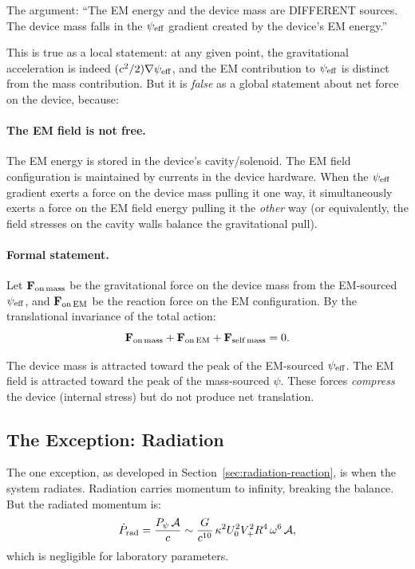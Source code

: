 \documentclass[11pt]{article}
\newcommand{\psieff}{\psi_{\rm eff}}
\begin{document}
The argument: ``The EM energy and the device mass are DIFFERENT sources.
The device mass falls in the $\psieff$ gradient created by the device's
EM energy.''

This is true as a local statement: at any given point, the gravitational
acceleration is indeed $(c^2/2)\nabla\psieff$, and the EM contribution to
$\psieff$ is distinct from the mass contribution. But it is \emph{false}
as a global statement about net force on the device, because:

\paragraph{The EM field is not free.}
The EM energy is stored in the device's cavity/solenoid. The EM field
configuration is maintained by currents in the device hardware. When the
$\psieff$ gradient exerts a force on the device mass pulling it one way,
it simultaneously exerts a force on the EM field energy pulling it the
\emph{other} way (or equivalently, the field stresses on the cavity walls
balance the gravitational pull).

\paragraph{Formal statement.}
Let $\mathbf{F}_{\rm on\,mass}$ be the gravitational force on the device
mass from the EM-sourced $\psieff$, and $\mathbf{F}_{\rm on\,EM}$ be the
reaction force on the EM configuration. By the translational invariance
of the total action:
\begin{equation}
\mathbf{F}_{\rm on\,mass} + \mathbf{F}_{\rm on\,EM}
+ \mathbf{F}_{\rm self\,mass} = 0.
\end{equation}

The device mass is attracted toward the peak of the EM-sourced $\psieff$.
The EM field is attracted toward the peak of the mass-sourced $\psi$.
These forces \emph{compress} the device (internal stress) but do not
produce net translation.

\subsection{The Exception: Radiation}

The one exception, as developed in Section~\ref{sec:radiation-reaction},
is when the system radiates. Radiation carries momentum to infinity,
breaking the balance. But the radiated momentum is:
\begin{equation}
\dot{P}_{\rm rad} = \frac{P_\psi\,\mathcal{A}}{c}
\sim \frac{G}{c^{10}}\,\kappa^2 U_0^2 V_+^2 R^4\,\omega^6\,\mathcal{A},
\end{equation}
which is negligible for laboratory parameters.
\end{document}

